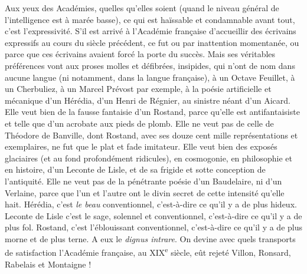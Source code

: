 \documentclass[french,twoside]{book} %
\begin{document}
Aux yeux des Académies, quelles qu’elles soient (quand le niveau général de l’intelligence est à marée basse), ce qui est haïssable et condamnable avant tout, c’est l’expressivité. S’il est arrivé à l’Académie française d’accueillir des écrivains expressifs au cours du siècle précédent, ce fut ou par inattention momentanée, ou parce que ces écrivains avaient forcé la porte du succès. Mais ses véritables préférences vont aux proses molles et défibrées, insipides, qui n’ont de nom dans aucune langue (ni notamment, dans la langue française), à un Octave Feuillet, à un Cherbuliez, à un Marcel Prévost par exemple, à la poésie artificielle et mécanique d’un Hérédia, d’un Henri de Régnier, au sinistre néant d’un Aicard. Elle veut bien de la fausse fantaisie d’un Rostand, parce qu’elle est antifantaisiste et telle que d’un acrobate aux pieds de plomb. Elle ne veut pas de celle de Théodore de Banville, dont Rostand, avec ses douze cent mille représentations et exemplaires, ne fut que le plat et fade imitateur. Elle veut bien des exposés glaciaires (et au fond profondément ridicules), en cosmogonie, en philosophie et en histoire, d’un Leconte de Lisle, et de sa frigide et sotte conception de l’antiquité. Elle ne veut pas de la pénétrante poésie d’un Baudelaire, ni d’un Verlaine, parce que l’un et l’autre ont le divin secret de cette intensité qu’elle hait. Hérédia, c’est {\itshape le beau} conventionnel, c’est-à-dire ce qu’il y a de plus hideux. Leconte de Lisle c’est le sage, solennel et conventionnel, c’est-à-dire ce qu’il y a de plus fol. Rostand, c’est l’éblouissant conventionnel, c’est-à-dire ce qu’il y a de plus morne et de plus terne. A eux le {\itshape dignus intrare}. On devine avec quels transports de satisfaction l’Académie française, au XIX\textsuperscript{e} siècle, eût rejeté Villon, Ronsard, Rabelais et Montaigne !\par
\end{document}

